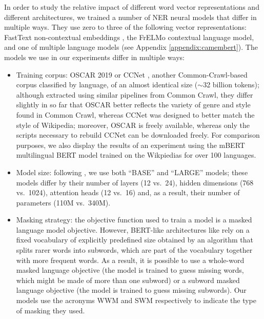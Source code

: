 In order to study the relative impact of different word vector representations and different architectures, we trained a number of NER neural models that differ in multiple ways. They use zero to three of the following vector representations: FastText non-contextual embeddings \citep{bojanowski-etal-2017-enriching}, the FrELMo contextual language model, and one of multiple \camembert language models \citep{martin-etal-2020-camembert} (see Appendix \ref{appendix:camembert}). The \camembert models we use in our experiments differ in multiple ways:
\begin{itemize}
    \item Training corpus: OSCAR 2019 or CCNet \citep{wenzek-etal-2020-ccnet}, another Common-Crawl-based corpus classified by language, of an almost identical size ($\sim$32 billion tokens); although extracted using similar pipelines from Common Crawl, they differ slightly in so far that OSCAR better reflects the variety of genre and style found in Common Crawl, whereas CCNet was designed to better match the style of Wikipedia; moreover, OSCAR is freely available, whereas only the scripts necessary to rebuild CCNet can be downloaded freely. For comparison purposes, we also display the results of an experiment using the mBERT multilingual BERT model trained on the Wikpiedias for over 100 languages.
    \item Model size: following \citet{devlin-etal-2019-bert}, we use both ``BASE'' and ``LARGE'' models; these models differ by their number of layers (12 vs.~24), hidden dimensions (768 vs.~1024), attention heads (12 vs.~16) and, as a result, their number of parameters (110M vs.~340M).
    \item Masking strategy: the objective function used to train a \camembert model is a masked language model objective. However, BERT-like architectures like \camembert rely on a fixed vocabulary of explicitly predefined size obtained by an algorithm that splits rarer words into subwords, which are part of the vocabulary together with more frequent words. As a result, it is possible to use a whole-word masked language objective (the model is trained to guess missing words, which might be made of more than one subword) or a subword masked language objective (the model is trained to guess missing subwords). Our models use the acronyms WWM and SWM respectively to indicate the type of masking they used.
\end{itemize}

